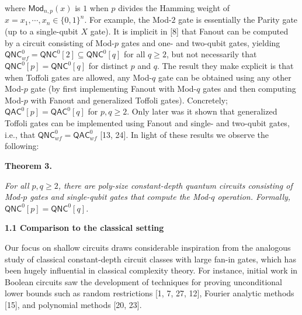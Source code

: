 where ${\mathsf{Mod}}_{n,p}(x)$ is $1$ when $p$ divides the Hamming weight of $x=x_{1},\cdots,x_{n}\in\{0,1\}^{n}$. For example, the Mod-$2$ gate is essentially the Parity gate (up to a single-qubit $X$ gate). It is implicit in [8] that Fanout can be computed by a circuit consisting of Mod-$p$ gates and one- and two-qubit gates, yielding ${\mathsf{QNC}}^{0}_{wf}={\mathsf{QNC}}^{0}[2]\subseteq{\mathsf{QNC}}^{0}[q]$ for all $q\geq 2$, but not necessarily that ${\mathsf{QNC}}^{0}[p]={\mathsf{QNC}}^{0}[q]$ for distinct $p$ and $q$. The result they make explicit is that when Toffoli gates are allowed, any Mod-$q$ gate can be obtained using any other Mod-$p$ gate (by first implementing Fanout with Mod-$q$ gates and then computing Mod-$p$ with Fanout and generalized Toffoli gates). Concretely; ${\mathsf{QAC}}^{0}[p]={\mathsf{QAC}}^{0}[q]$ for $p,q\geq 2$. Only later was it shown that generalized Toffoli gates can be implemented using Fanout and single- and two-qubit gates, i.e., that ${\mathsf{QNC}}^{0}_{wf}={\mathsf{QAC}}^{0}_{wf}$ [13, 24]. In light of these results we observe the following:\par





\par\medskip\noindent\textbf{
\textbf{Theorem 3}\textbf{.}
}\par



\emph{For all $p,q\geq 2$, there are poly-size constant-depth quantum circuits consisting of Mod-$p$ gates and single-qubit gates that compute the Mod-$q$ operation. Formally, ${\mathsf{QNC}}^{0}[p]={\mathsf{QNC}}^{0}[q]$.}\par






\par\medskip\noindent\textbf{
1.1 Comparison to the classical setting}\par




Our focus on shallow circuits draws considerable inspiration from the analogous study of classical constant-depth circuit classes with large fan-in gates, which has been hugely influential in classical complexity theory. For instance, initial work in Boolean circuits saw the development of techniques for proving unconditional lower bounds such as random restrictions [1, 7, 27, 12], Fourier analytic methods [15], and polynomial methods [20, 23].\par




